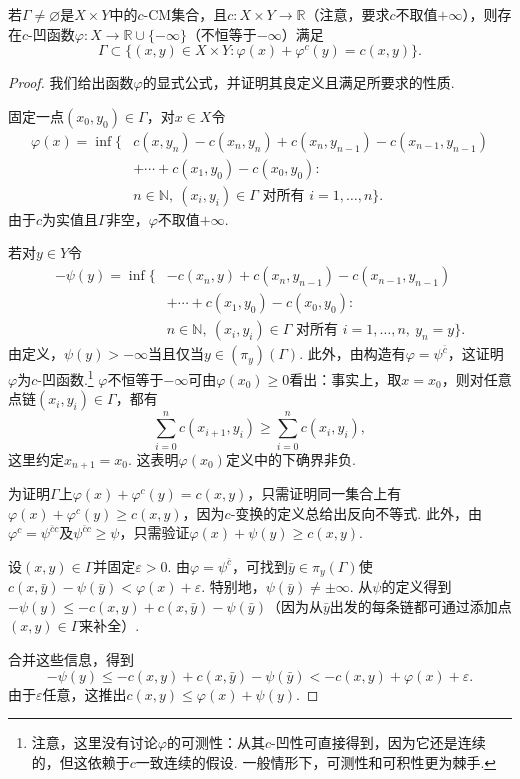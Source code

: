 \begin{theorem}\label{obj:1.37}
若$\Gamma\ne\varnothing$是$X\times Y$中的$c$-CM集合，且$c:X\times Y\to\mathbb R$（注意，要求$c$不取值$+\infty$），则存在$c$-凹函数$\varphi:X\to\mathbb R\cup\{-\infty\}$（不恒等于$-\infty$）满足
\[
\Gamma\subset\{(x,y)\in X\times Y:\varphi(x)+\varphi^c(y)=c(x,y)\}.
\]
\end{theorem}
\begin{proof}
我们给出函数$\varphi$的显式公式，并证明其良定义且满足所要求的性质.

固定一点$(x_0,y_0)\in\Gamma$，对$x\in X$令
\begin{equation*}
\begin{aligned}
\varphi(x)=\inf\bigl\{&c(x,y_n)-c(x_n,y_n)+c(x_n,y_{n-1})-c(x_{n-1},y_{n-1})\\
&+\cdots+c(x_1,y_0)-c(x_0,y_0):\\
&n\in\mathbb N,\ (x_i,y_i)\in\Gamma\text{ 对所有 }i=1,\ldots,n\bigr\}.
\end{aligned}
\end{equation*}
由于$c$为实值且$\Gamma$非空，$\varphi$不取值$+\infty$.

若对$y\in Y$令
\begin{equation*}
\begin{aligned}
-\psi(y)=\inf\bigl\{&-c(x_n,y)+c(x_n,y_{n-1})-c(x_{n-1},y_{n-1})\\
&+\cdots+c(x_1,y_0)-c(x_0,y_0):\\
&n\in\mathbb N,\ (x_i,y_i)\in\Gamma\text{ 对所有 }i=1,\ldots,n,\ y_n=y\bigr\}.
\end{aligned}
\end{equation*}
由定义，$\psi(y)>-\infty$当且仅当$y\in(\pi_y)(\Gamma)$. 此外，由构造有$\varphi=\psi^{\bar c}$，这证明$\varphi$为$c$-凹函数.\footnote{注意，这里没有讨论$\varphi$的可测性：从其$c$-凹性可直接得到，因为它还是连续的，但这依赖于$c$一致连续的假设. 一般情形下，可测性和可积性更为棘手.} $\varphi$不恒等于$-\infty$可由$\varphi(x_0)\ge0$看出：事实上，取$x=x_0$，则对任意点链$(x_i,y_i)\in\Gamma$，都有
\[
\sum_{i=0}^n c(x_{i+1},y_i)\ge\sum_{i=0}^n c(x_i,y_i),
\]
这里约定$x_{n+1}=x_0$. 这表明$\varphi(x_0)$定义中的下确界非负.

为证明$\Gamma$上$\varphi(x)+\varphi^c(y)=c(x,y)$，只需证明同一集合上有$\varphi(x)+\varphi^c(y)\ge c(x,y)$，因为$c$-变换的定义总给出反向不等式. 此外，由$\varphi^c=\psi^{\bar c c}$及$\psi^{\bar c c}\ge\psi$，只需验证$\varphi(x)+\psi(y)\ge c(x,y)$.

设$(x,y)\in\Gamma$并固定$\varepsilon>0$. 由$\varphi=\psi^{\bar c}$，可找到$\bar y\in\pi_y(\Gamma)$使$c(x,\bar y)-\psi(\bar y)<\varphi(x)+\varepsilon$. 特别地，$\psi(\bar y)\ne\pm\infty$. 从$\psi$的定义得到$-\psi(y)\le-c(x,y)+c(x,\bar y)-\psi(\bar y)$（因为从$\bar y$出发的每条链都可通过添加点$(x,y)\in\Gamma$来补全）.

合并这些信息，得到
\[
-\psi(y)\le-c(x,y)+c(x,\bar y)-\psi(\bar y)
<-c(x,y)+\varphi(x)+\varepsilon.
\]
由于$\varepsilon$任意，这推出$c(x,y)\le\varphi(x)+\psi(y)$.
\end{proof}

